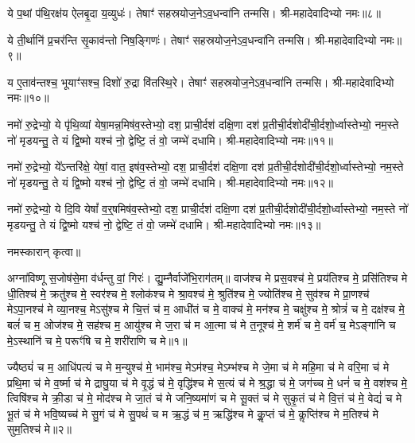 ये प॒थां प॑थि॒रक्ष॑य ऐलबृ॒दा य॒व्युधः॑। तेषाꣳ॑ सहस्रयोज॒ने\-ऽव॒धन्वा॑नि तन्मसि। श्री-महादेवादिभ्यो नमः॥८॥

ये ती॒र्थानि॑ प्र॒चर॑न्ति सृ॒काव॑न्तो निष॒ङ्गिणः॑। तेषाꣳ॑ सहस्रयोज॒ने\-ऽव॒धन्वा॑नि तन्मसि। श्री-महादेवादिभ्यो नमः॥९॥

य ए॒ताव॑न्तश्च॒ भूयाꣳ॑सश्च॒ दिशो॑ रु॒द्रा वि॑तस्थि॒रे। तेषाꣳ॑ सहस्रयोज॒ने\-ऽव॒धन्वा॑नि तन्मसि। श्री-महादेवादिभ्यो नमः॥१०॥

नमो॑ रु॒द्रेभ्यो॒ ये पृ॑थि॒व्यां येषा॒मन्न॒मिष॑व॒स्तेभ्यो॒ दश॒ प्राची॒र्दश॑ दक्षि॒णा दश॑ प्र॒तीची॒र्दशो\-दी॑ची॒र्दशो॒र्ध्वास्तेभ्यो॒ नम॒स्ते नो॑ मृडयन्तु॒ ते यं द्वि॒ष्मो यश्च॑ नो॒ द्वेष्टि॒ तं वो॒ जम्भे॑ दधामि। श्री-महादेवादिभ्यो नमः॥११॥ 

नमो॑ रु॒द्रेभ्यो॒ ये᳚ऽन्तरि॑क्षे॒ येषां॒ वात॒ इष॑व॒स्तेभ्यो॒ दश॒ प्राची॒र्दश॑ दक्षि॒णा दश॑ प्र॒तीची॒र्दशो\-दी॑ची॒र्दशो॒र्ध्वास्तेभ्यो॒ नम॒स्ते नो॑ मृडयन्तु॒ ते यं द्वि॒ष्मो यश्च॑ नो॒ द्वेष्टि॒ तं वो॒ जम्भे॑ दधामि। श्री-महादेवादिभ्यो नमः॥१२॥ 

नमो॑ रु॒द्रेभ्यो॒ ये दि॒वि येषां᳚ व॒र्॒‌षमिष॑व॒स्तेभ्यो॒ दश॒ प्राची॒र्दश॑ दक्षि॒णा दश॑ प्र॒तीची॒र्दशो\-दी॑ची॒र्दशो॒र्ध्वास्तेभ्यो॒ नम॒स्ते नो॑ मृडयन्तु॒ ते यं द्वि॒ष्मो यश्च॑ नो॒ द्वेष्टि॒ तं वो॒ जम्भे॑ दधामि। श्री-महादेवादिभ्यो नमः॥१३॥ 

नमस्कारान् कृत्वा॥

{\small\closesection}


अग्ना॑विष्णू स॒जोष॑से॒मा व॑र्धन्तु वां॒ गिरः॑। द्यु॒म्नैर्वाजे॑भि॒रा\-ग॑तम्॥ 
वाज॑श्च मे प्रस॒वश्च॑ मे॒ प्रय॑तिश्च मे॒ प्रसि॑तिश्च मे धी॒तिश्च॑ मे॒ क्रतु॑श्च मे॒ स्वर॑श्च मे॒ श्लोक॑श्च मे श्रा॒वश्च॑ मे॒ श्रुति॑श्च मे॒ ज्योति॑श्च मे॒ सुव॑श्च मे प्रा॒णश्च॑ मेऽपा॒नश्च॑ मे व्या॒नश्च॒ मेऽसु॑श्च मे चि॒त्तं च॑ म॒ आधी॑तं च मे॒ वाक्च॑ मे॒ मन॑श्च मे॒ चक्षु॑श्च मे॒ श्रोत्रं॑ च मे॒ दक्ष॑श्च मे॒ बलं॑ च म॒ ओज॑श्च मे॒ सह॑श्च म॒ आयु॑श्च मे ज॒रा च॑ म आ॒त्मा च॑ मे त॒नूश्च॑ मे॒ शर्म॑ च मे॒ वर्म॑ च॒ मेऽङ्गा॑नि च मे॒ऽस्थानि॑ च मे॒ परूꣳ॑षि च मे॒ शरी॑राणि च मे॥१॥ 

ज्यैष्ठ्यं॑ च म॒ आधि॑पत्यं च मे म॒न्युश्च॑ मे॒ भाम॑श्च॒ मेऽम॑श्च॒ मेऽम्भ॑श्च मे जे॒मा च॑ मे महि॒मा च॑ मे वरि॒मा च॑ मे प्रथि॒मा च॑ मे व॒र्ष्मा च॑ मे द्राघु॒या च॑ मे वृ॒द्धं च॑ मे॒ वृद्धि॑श्च मे स॒त्यं च॑ मे श्र॒द्धा च॑ मे॒ जग॑च्च मे॒ धनं॑ च मे॒ वश॑श्च मे॒ त्विषि॑श्च मे क्री॒डा च॑ मे॒ मोद॑श्च मे जा॒तं च॑ मे जनि॒ष्यमा॑णं च मे सू॒क्तं च॑ मे सुकृ॒तं च॑ मे वि॒त्तं च॑ मे॒ वेद्यं॑ च मे भू॒तं च॑ मे भवि॒ष्यच्च॑ मे सु॒गं च॑ मे सु॒पथं॑ च म ऋ॒द्धं च॑ म॒ ऋद्धि॑श्च मे कॢ॒प्तं च॑ मे॒ कॢप्ति॑श्च मे म॒तिश्च॑ मे सुम॒तिश्च॑ मे॥२॥ 

